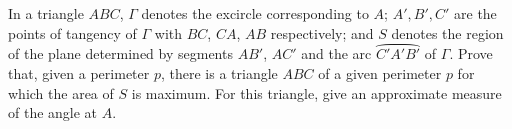 In a triangle $ABC$,
$\Gamma$ denotes the excircle corresponding to $A$;
$A', B', C'$ are the points of tangency of $\Gamma$ with $BC$, $CA$, $AB$ respectively;
and $S$ denotes the region of the plane determined by segments $AB'$, $AC'$ and the arc $\wideparen{C'A'B'}$ of $\Gamma$.
Prove that, given a perimeter $p$, there is a triangle $ABC$ of a given perimeter $p$ for which the area of $S$ is maximum. For this triangle, give an approximate measure of the angle at $A$.
